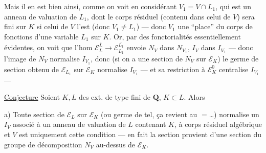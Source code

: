Mais il en est bien ainsi, comme on voit en considérant $V_1=V\cap L_1$, qui est un anneau de valuation de $L_1$,
dont le corps résiduel (contenu dans celui de $V$) sera  fini sur $K$ si celui de $V$ l'est (donc $V_1\ne L_1$) --- donc $V_1$ \deleted{$\longrightarrow$}  une ``place'' du corps de fonctions d'une variable $L_1$ sur $K$. Or, par des fonctorialités essentiellement évidentes, on voit que l'hom $\mathcal E_L^{\overline L}\longrightarrow\mathcal E_{L_1}^{\overline{L_1}}$ envoie $N_V$ dans $N_{V_1}$, $I_V$ dans $I_{V_1}$ --- donc l'image de $N_V$ normalise $I_{V_1}$, donc (si on a une  section de $N_V$ sur $\mathcal E_K$) le germe de section obtenu de $\mathcal E_{L_1}$ sur $\mathcal E_K$ normalise $I_{V_1}$ --- et sa restriction à $\mathcal E_K^0$ centralise $I_{V_1}$ ---

\uline{Conjecture} Soient $K,L$ des ext. de type fini de $\mathbf Q$, $K\subset L$. Alors

a) Toute section de $\mathcal E_L$ sur $\mathcal E_K$ (ou germe de tel, ça revient au $=$\ldots) normalise un $I_V$ associé à un anneau de valuation  de $L$ contenant $K$, à corps résiduel algébrique  \deleted{\unsure{,}} et  $V$ est uniquement
 cette condition --- en fait la section provient d'une section du groupe de décomposition $N_V$ au-dessus de $\mathcal E_K$.

